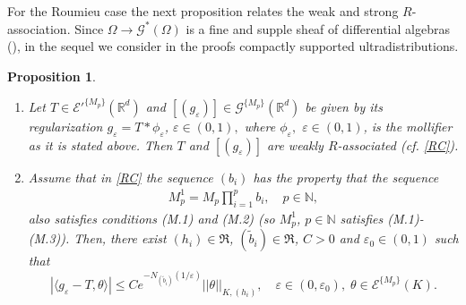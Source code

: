 \documentclass[sn-mathphys,Numbered]{sn-jnl}%
\theoremstyle{thmstyleone}%
\newtheorem{proposition}[theorem]{Proposition}%
\theoremstyle{thmstyletwo}%
\theoremstyle{thmstylethree}%
\begin{document}
For the Roumieu case  the next  proposition relates the weak and strong $R$-association.  
Since  $\Omega\to\mathcal{G}^*(\Omega)$ is a fine and supple sheaf of differential algebras (\cite[Proposition 4.3]{D.V.1}), in the sequel we consider in the proofs compactly supported ultradistributions. 

\begin{proposition}\label{RUM}
\begin{enumerate}
\item[a)] Let $T\in\mathcal E'^{\{M_p\}}(\mathbb R^d)$ and $[(g_\varepsilon)]\in\mathcal G^{\{M_p\}}(\mathbb R^d)$ be given by its regularization $g_\varepsilon= T*\phi_\varepsilon$,  $\varepsilon\in (0,1),$ where $\phi_\varepsilon, $ $\varepsilon \in (0,1)$, is the mollifier as it is stated above.  Then  $T$ and $[(g_\varepsilon)]$ are weakly $R$-associated (cf.  \eqref{RC}).
\item[b)] Assume that in \eqref{RC} the sequence $(b_i)$ has the property that the sequence 
\begin{align*}
M^1_p=M_p\prod_{i=1}^pb_i, \quad p\in\mathbb N,
\end{align*}
also satisfies conditions (M.1) and (M.2) (so $M_p^1$,  $p\in\mathbb N$ satisfies (M.1)-(M.3)).  Then,  there exist  $(h_i)\in\mathfrak R$,  $(\tilde b_i)\in\mathfrak R$,  $C>0$ and $\varepsilon_0\in(0,1)$ such that
\begin{equation*}\label{uslrum}
|\langle g_\varepsilon-T,\theta\rangle|\leq Ce^{-N_{(\tilde b_i)}(1/\varepsilon)}||\theta||_{K,(h_i)}, \quad \varepsilon\in(0,\varepsilon_0),\; \theta\in\mathcal E^{\{M_p\}}(K).
\end{equation*}
\end{enumerate}
\end{proposition}
\end{document}
